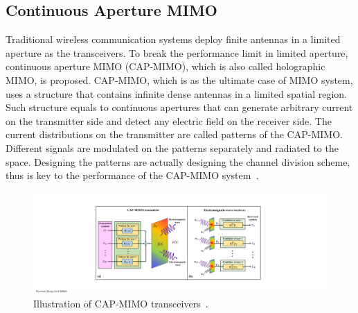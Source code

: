 \documentclass[journal,twocolumn]{IEEEtran}
\begin{document}

\subsection{Continuous Aperture MIMO}
Traditional wireless communication systems deploy finite antennas in a limited aperture as the transceivers. To break the performance limit in limited aperture, continuous aperture MIMO (CAP-MIMO), which is also called holographic MIMO, is proposed. CAP-MIMO, which is as the ultimate case of MIMO system, uses a structure that contains infinite dense antennas in a limited spatial region. Such structure equals to continuous apertures that can generate arbitrary current on the transmitter side and detect any electric field on the receiver side. The current distributions on the transmitter are called patterns of the CAP-MIMO. Different signals are modulated on the patterns separately and radiated to the space. Designing the patterns are actually designing the channel division scheme, thus is key to the performance of the CAP-MIMO system~\cite{zhang2022pdma}.

\begin{figure}
	\centering 
	\includegraphics[width=0.9\linewidth]{figures/CAPMIMO.pdf} 
	\caption{Illustration of CAP-MIMO transceivers~\cite{zhang2022pdma}.  }
	\label{fig:CAPMIMO}
\end{figure}
\end{document}
